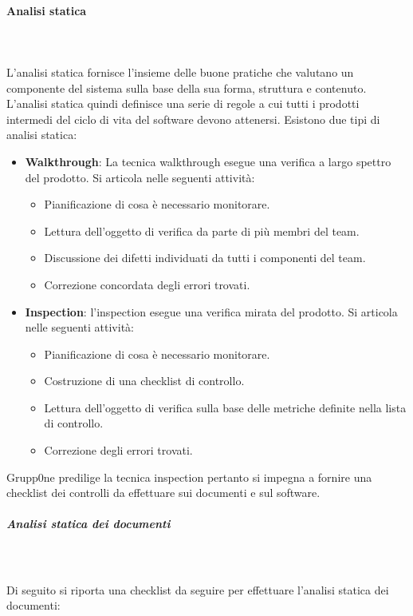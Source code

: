 \documentclass[../norme-di-progetto.tex]{subfiles}
\begin{document}
\paragraph{Analisi statica}\mbox{}\\
\label{par:analisi statica}
\\L'analisi statica  fornisce l'insieme delle buone pratiche che valutano un componente del sistema sulla base della sua forma, struttura e contenuto. L'analisi statica quindi definisce una serie di regole  a cui tutti i prodotti intermedi del ciclo di vita del software devono attenersi. Esistono due tipi di analisi statica:
\begin{itemize} 
	\item \textbf{Walkthrough}: La tecnica walkthrough esegue una verifica a largo spettro del prodotto. Si articola nelle seguenti attività:
	\begin{itemize}
		\item Pianificazione di cosa è necessario monitorare.
		\item Lettura dell'oggetto di verifica da parte di più membri del team.
		\item Discussione dei difetti individuati da tutti i componenti del team.
		\item Correzione concordata degli errori trovati.
	\end{itemize}
	\item \textbf{Inspection}: l'inspection esegue una verifica mirata del prodotto. Si articola nelle seguenti attività:
	\begin{itemize}
		\item Pianificazione di cosa è necessario monitorare.
		\item Costruzione di una checklist di controllo.
		\item Lettura dell'oggetto di verifica sulla base delle metriche definite nella lista di controllo.
		\item Correzione degli errori trovati.
	\end{itemize}
\end{itemize}
Grupp0ne predilige la tecnica inspection pertanto si impegna a fornire una checklist dei controlli da effettuare sui documenti e sul software.
\subparagraph{Analisi statica dei documenti}\mbox{}\\
\label{subp:analisi statica dei documenti}
\\ Di seguito si riporta una checklist da seguire per effettuare l'analisi statica dei documenti:
\end{document}
